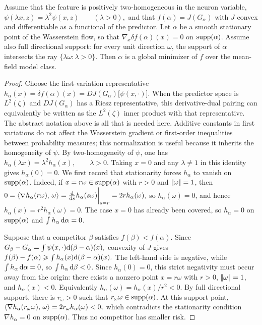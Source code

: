 \begin{prop}\label{prop-formal-chizat-bach}
Assume that the feature is positively two-homogeneous in the neuron variable, \(\psi(\lambda x,z)=\lambda^2\psi(x,z) \qquad(\lambda>0),\)
and that $f(\alpha)=J(G_\alpha)$ with $J$ convex and differentiable as a functional of the predictor. Let $\alpha$ be a smooth stationary point of the Wasserstein flow, so that $\nabla_x\delta f(\alpha)(x)=0$ on $\operatorname{supp}(\alpha)$. Assume also full directional support: for every unit direction $\omega$, the support of $\alpha$ intersects the ray $\{\lambda\omega:\lambda>0\}$. Then $\alpha$ is a global minimizer of $f$ over the mean-field model class.
\end{prop}
\begin{proof}
Choose the first-variation representative
\(h_\alpha(x)=\delta f(\alpha)(x) = DJ(G_\alpha)\bigl[\psi(x,\cdot)\bigr].\)
When the predictor space is $L^2(\zeta)$ and $DJ(G_\alpha)$ has a Riesz representative, this derivative-dual pairing can equivalently be written as the $L^2(\zeta)$ inner product with that representative. The abstract notation above is all that is needed here.
Additive constants in first variations do not affect the Wasserstein gradient or first-order inequalities between probability measures; this normalization is useful because it inherits the homogeneity of $\psi$. By two-homogeneity of $\psi$, one has
\(h_\alpha(\lambda x)=\lambda^2h_\alpha(x), \qquad \lambda>0.\)
Taking \(x=0\) and any \(\lambda\neq1\) in this identity gives \(h_\alpha(0)=0\). We first record that stationarity forces \(h_\alpha\) to vanish on \(\operatorname{supp}(\alpha)\). Indeed, if \(x=r\omega\in\operatorname{supp}(\alpha)\) with \(r>0\) and \(|\!| \omega |\!|=1\), then
\(0=\langle \nabla h_\alpha(r\omega),\,\omega\rangle =\frac{\mathrm{d}}{\mathrm{d} s}h_\alpha(s\omega)\bigg|_{s=r} =2r h_\alpha(\omega),\)
so \(h_\alpha(\omega)=0\), and hence \(h_\alpha(x)=r^2h_\alpha(\omega)=0\). The case \(x=0\) has already been covered, so \(h_\alpha=0\) on \(\operatorname{supp}(\alpha)\) and \(\int h_\alpha\,\mathrm{d}\alpha=0\).

Suppose that a competitor \(\beta\) satisfies \(f(\beta)<f(\alpha)\). Since
\(G_\beta-G_\alpha = \int \psi(x,\cdot)\mathrm{d}(\beta-\alpha)(x),\)
convexity of \(J\) gives \(f(\beta)-f(\alpha) \geqslant \int h_\alpha(x)\mathrm{d}(\beta-\alpha)(x).\)
The left-hand side is negative, while \(\int h_\alpha\,\mathrm{d}\alpha=0\), so \(\int h_\alpha\,\mathrm{d}\beta<0\). Since \(h_\alpha(0)=0\), this strict negativity must occur away from the origin: there exists a nonzero point \(x=r\omega\) with \(r>0\), \(|\!| \omega |\!|=1\), and \(h_\alpha(x)<0\). Equivalently \(h_\alpha(\omega)=h_\alpha(x)/r^2<0\). By full directional support, there is \(r_\omega>0\) such that \(r_\omega\omega\in\operatorname{supp}(\alpha)\). At this support point,
\(\langle \nabla h_\alpha(r_\omega\omega),\,\omega\rangle = 2r_\omega h_\alpha(\omega) <0,\)
which contradicts the stationarity condition \(\nabla h_\alpha=0\) on \(\operatorname{supp}(\alpha)\). Thus no competitor has smaller risk.


\end{proof}

